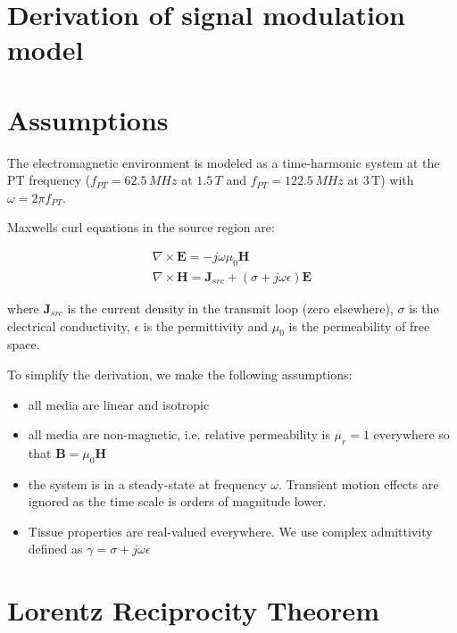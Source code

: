 \section{Derivation of signal modulation model}
\label{app:derivation}
\section{Assumptions}
\label{app:derivation}

The electromagnetic environment is modeled as a time-harmonic system at the PT frequency ($f_{PT}=62.5\,MHz$ at $1.5\,T$ and $f_{PT}=122.5\,MHz$ at 3\,T) with $\omega=2\pi f_{PT}$.

Maxwells curl equations in the source region are:

\begin{align}
    \nabla \times \mathbf{E} = -j\omega\mu_0 \mathbf{H} \label{maxwell1}\\
    \nabla \times \mathbf{H} = \mathbf{J}_{src} + (\sigma+j\omega\epsilon)\mathbf{E} \label{maxwell2}
\end{align}

where $\mathbf{J}_{src}$ is the current density in the transmit loop (zero elsewhere), $\sigma$ is the electrical conductivity, $\epsilon$ is the permittivity and $\mu_0$ is the permeability of free space.

To simplify the derivation, we make the following assumptions:
\begin{itemize}
    \item all media are linear and isotropic
    \item all media are non-magnetic, i.e. relative permeability is $\mu_r=1$ everywhere so that $\mathbf{B}=\mu_0 \mathbf{H}$
    \item the system is in a steady-state at frequency $\omega$. Transient motion effects are ignored as the time scale is orders of magnitude lower.
    \item Tissue properties are real-valued everywhere. We use complex admittivity defined as $\gamma = \sigma + j\omega\epsilon$
\end{itemize}

\section{Lorentz Reciprocity Theorem}

